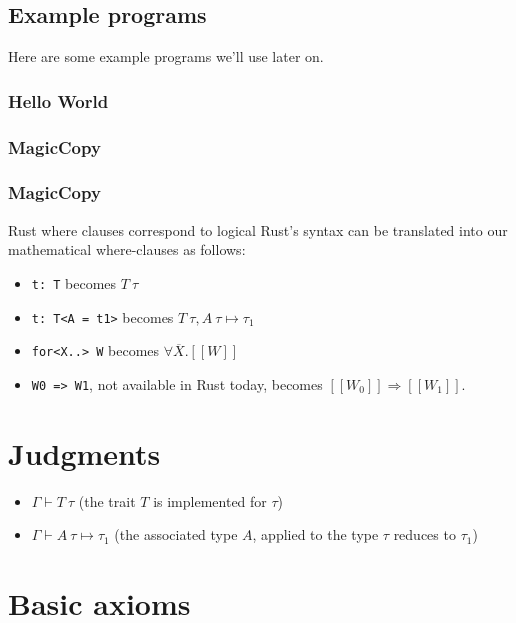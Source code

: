 \documentclass[sn-mathphys-num]{sn-jnl}%
\newcommand{\code}[1]{{\tt #1}}
\theoremstyle{thmstyleone}%
\theoremstyle{thmstyletwo}%
\theoremstyle{thmstylethree}%
\begin{document}
\subsection{Example programs}

Here are some example programs we'll use later on.

\subsubsection{Hello World}

\subsubsection{MagicCopy}

\subsubsection{MagicCopy}

Rust where clauses correspond to logical
Rust's syntax can be translated into our mathematical where-clauses as follows:

\begin{itemize}
    \item \code{t: T} becomes $T\:\tau$
    \item \code{t: T<A = t1>} becomes $T\:\tau, A\:\tau \mapsto \tau_1$
    \item \code{for<X..> W} becomes $\forall\overline{X}. [\![ W ]\!]$
    \item \code{W0 => W1}, not available in Rust today, becomes $[\![ W_0 ]\!] \Rightarrow [\![ W_1 ]\!]$.
\end{itemize}

\section{Judgments}

\begin{itemize}
    \item $\Gamma \vdash T \: \tau$ (the trait $T$ is implemented for $\tau$)
    \item $\Gamma \vdash A \: \tau \mapsto \tau_1$ (the associated type $A$, applied to the type $\tau$ reduces to $\tau_1$)
\end{itemize}

\section{Basic axioms}
\end{document}
